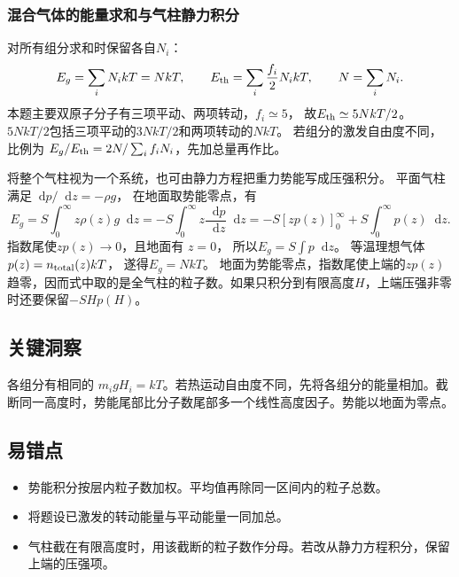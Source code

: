 \documentclass[UTF8,fontset=fandol,a4paper,11pt]{ctexart}
\newcommand{\dd}{\mathop{}\!\mathrm{d}}
\begin{document}
\subsubsection*{混合气体的能量求和与气柱静力积分}
对所有组分求和时保留各自$N_i$：
\[
E_g=\sum_iN_i kT=NkT,\qquad
E_{\rm th}=\sum_i\frac{f_i}{2}N_i kT,\qquad N=\sum_iN_i.
\]
本题主要双原子分子有三项平动、两项转动，$f_i\simeq5$，
故$E_{\rm th}\simeq5NkT/2$。
$5NkT/2$包括三项平动的$3NkT/2$和两项转动的$NkT$。
若组分的激发自由度不同，比例为
$E_g/E_{\rm th}=2N/\sum_i f_iN_i$，先加总量再作比。

将整个气柱视为一个系统，也可由静力方程把重力势能写成压强积分。
平面气柱满足$\dd p/\dd z=-\rho g$，
在地面取势能零点，有
\[
E_g=S\int_0^\infty z\rho(z)g\dd z
=-S\int_0^\infty z\frac{\dd p}{\dd z}\dd z
=-S[zp(z)]_0^\infty+S\int_0^\infty p(z)\dd z.
\]
指数尾使$zp(z)\to0$，且地面有 $z=0$，
所以$E_g=S\int p\dd z$。
等温理想气体$p(z)=n_{\rm total}(z)kT$，
遂得$E_g=NkT$。
地面为势能零点，指数尾使上端的$zp(z)$趋零，因而式中取的是全气柱的粒子数。如果只积分到有限高度$H$，上端压强非零时还要保留$-SHp(H)$。




\subsection*{关键洞察}

各组分有相同的 $m_igH_i=kT$。若热运动自由度不同，先将各组分的能量相加。截断同一高度时，势能尾部比分子数尾部多一个线性高度因子。势能以地面为零点。



\subsection*{易错点}

\begin{itemize}
\item 势能积分按层内粒子数加权。平均值再除同一区间内的粒子总数。
\item 将题设已激发的转动能量与平动能量一同加总。
\item 气柱截在有限高度时，用该截断的粒子数作分母。若改从静力方程积分，保留上端的压强项。
\end{itemize}


\end{document}
